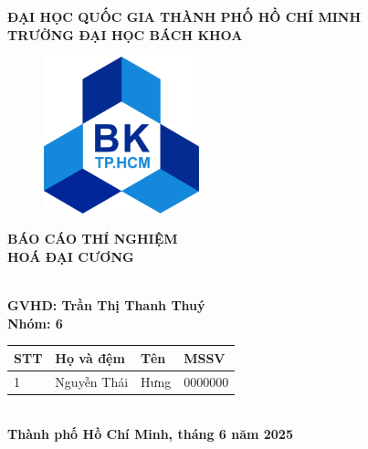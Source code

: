 \documentclass[12pt]{article}
\begin{document}
\begin{titlepage}
    \centering
    {\textbf{ĐẠI HỌC QUỐC GIA THÀNH PHỐ HỒ CHÍ MINH}} \\   
    {\textbf{TRƯỜNG ĐẠI HỌC BÁCH KHOA}} \\   
\begin{figure}[h]
    \centering
    \includegraphics[width=0.4\textwidth]{img/Bach khoa.png}
\end{figure}
    {\huge \textbf{BÁO CÁO THÍ NGHIỆM  }} \\
    {\huge \textbf{HOÁ ĐẠI CƯƠNG}} \\
    \hrulefill \\
    \vspace{0.5cm}
    
    { \textbf{GVHD: Trần Thị Thanh Thuý}} \\
    { \textbf{Nhóm: 6}} \\
    \vspace{0.5cm}

\begin{tabular}{|m{1cm}|m{3cm}|m{3cm}|m{2cm}|}
\hline
STT & Họ và đệm  & Tên &  MSSV \\ \hline
1 & Nguyễn Thái & Hưng & 0000000 \\ \hline
\end{tabular}
\vspace{6cm} \\
\textbf{Thành phố Hồ Chí Minh, tháng 6 năm 2025}
\end{titlepage}

\tableofcontents
\newpage
\end{document}

